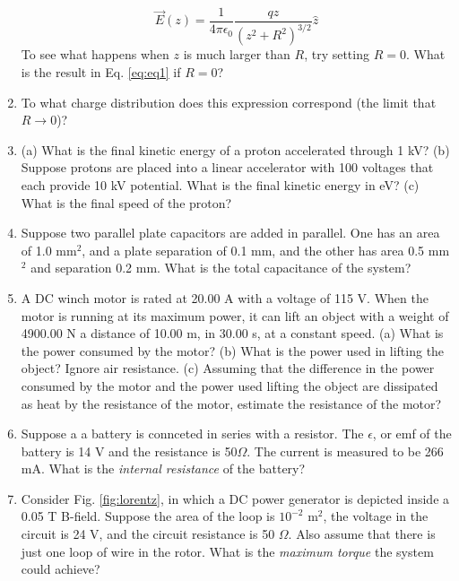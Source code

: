 \documentclass[10pt]{article}
\begin{document}
\begin{enumerate}
\begin{equation}
\vec{E}(z) = \frac{1}{4\pi \epsilon_0} \frac{q z}{\left( z^2 + R^2 \right)^{3/2}} \hat{z} \label{eq:eq1}
\end{equation}
To see what happens when $z$ is much larger than $R$, try setting $R=0$.  What is the result in Eq. \ref{eq:eq1} if $R=0$? \\ \vspace{1cm}
\item To what charge distribution does this expression correspond (the limit that $R \rightarrow 0$)? \\ \vspace{1cm}
\item (a) What is the final kinetic energy of a proton accelerated through 1 kV? (b) Suppose protons are placed into a linear accelerator with 100 voltages that each provide 10 kV potential.  What is the final kinetic energy in eV?  (c) What is the final speed of the proton? \\ \vspace{1.5cm}
\item Suppose two parallel plate capacitors are added in parallel.  One has an area of 1.0 mm$^2$, and a plate separation of 0.1 mm, and the other has area 0.5 mm$^2$ and separation 0.2 mm.  What is the total capacitance of the system? \\ \vspace{1cm}
\clearpage
\item A DC winch motor is rated at 20.00 A with a voltage of 115 V. When the motor is running at its maximum power, it can lift an object with a weight of 4900.00 N a distance of 10.00 m, in 30.00 s, at a constant speed. (a) What is the power consumed by the motor? (b) What is the power used in lifting the object? Ignore air resistance. (c) Assuming that the difference in the power consumed by the motor and the power used lifting the object are dissipated as heat by the resistance of the motor, estimate the resistance of the motor? \\ \vspace{2.5cm}
\item Suppose a a battery is connceted in series with a resistor.  The $\epsilon$, or emf of the battery is 14 V and the resistance is 50$\Omega$.  The current is measured to be 266 mA.  What is the \textit{internal resistance} of the battery? \\ \vspace{1.5cm}
\item Consider Fig. \ref{fig:lorentz}, in which a DC power generator is depicted inside a 0.05 T B-field.  Suppose the area of the loop is $10^{-2}$ m$^{2}$, the voltage in the circuit is 24 V, and the circuit resistance is 50 $\Omega$.  Also assume that there is just one loop of wire in the rotor.  What is the \textit{maximum torque} the system could achieve? \\ \vspace{2cm}

\end{enumerate}
\end{document}
